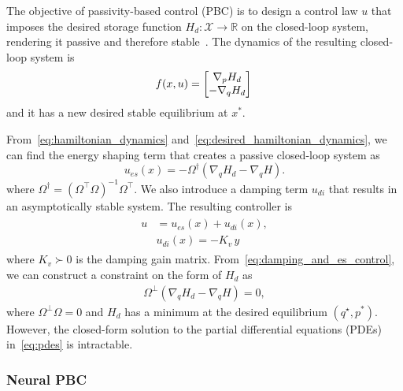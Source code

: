 The objective of passivity-based control (PBC) is to design a control
law $u$ that imposes the desired storage function $H_d: \mathcal{X} \rightarrow
\mathbb{R}$ on the closed-loop system, rendering it passive and therefore
stable~\cite{van2000l2}.
%
The dynamics of the resulting closed-loop system is 
\begin{align}
  \begin{split}  
    f(x, u) &= \begin{bmatrix}\nabla_pH_d \\ -\nabla_qH_d\end{bmatrix}\, \\
  \end{split}
  \label{eq:desired_hamiltonian_dynamics}
\end{align}
\noindent and it has a new desired stable equilibrium at $x^*$.

From~\eqref{eq:hamiltonian_dynamics}
and~\eqref{eq:desired_hamiltonian_dynamics}, we can find the energy shaping term
that creates a passive closed-loop system as
%
\begin{equation}
  u_{es}(x) =  -\Omega^{\dagger} \left( \nabla_q H_d - \nabla_q H \right).
  \label{eq:esc}
\end{equation}
\noindent where $\Omega^\dagger = \left( \Omega^\top \Omega  \right)^{-1}
\Omega^\top$. We also introduce a damping term $u_{di}$ that results in an
asymptotically stable system. The resulting controller is
\begin{align}
  \begin{split} 
    u &= u_{es}(x) + u_{di}(x), \\
    &u_{di}(x) = - K_{v} \, y
  \end{split}
  \label{eq:damping_and_es_control}
\end{align}
\noindent where $K_v \succ 0$ is the damping gain matrix.
From~\eqref{eq:damping_and_es_control}, we can construct a constraint on the
form of $H_d$ as 
\begin{align}
  \Omega^\bot \left( \nabla_q H_d - \nabla_q H \right) = 0,
    \label{eq:pdes}
\end{align}
where $\Omega^\perp \Omega = 0$ and $H_d$ has a minimum at the desired
equilibrium $(q^\star, p^*)$. 
%
However, the closed-form solution to the partial differential
equations (PDEs) in~\eqref{eq:pdes} is intractable. 

\subsubsection{Neural PBC}


